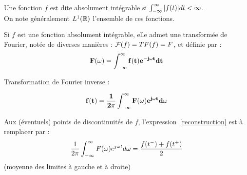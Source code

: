 \begin{definition}
Une fonction $f$ est dite absolument intégrable si $\int_{-\infty}^{\infty} |f(t)|dt<\infty$. \\ On note généralement $L^1(\mathbb{R})$ l'ensemble de ces fonctions.


\end{definition}


\begin{boxedminipage}{15cm}
\begin{definition}

Si $f$ est une fonction absolument intégrable, elle admet une transformée de Fourier, notée de diverses manières : ${\cal F}(f)=TF(f)=F$, et définie par :
\begin{equation}
{\bf F(\omega)=\int_{-\infty}^{\infty}f(t)e^{-j\omega t}dt}
\end{equation}

Transformation de Fourier inverse :

 \begin{equation}
{\bf f(t)=\frac{1}{2\pi}\int_{-\infty}^{\infty}F(\omega)e^{j\omega t}d\omega}
\label{reconstruction}
\end{equation}

\begin{remark}
Aux (éventuels) points de discontinuités de $f$, l'expression~\ref{reconstruction} est à remplacer par : 
 \begin{equation}
\frac{1}{2\pi}\int_{-\infty}^{\infty} F(\omega)e^{j\omega t}d\omega=\frac{f(t^-)+f(t^+)}{2}
\label{reconstruction2}
\end{equation}
(moyenne des limites à gauche et à droite)
\end{remark}
\end{definition}
\end{boxedminipage}


